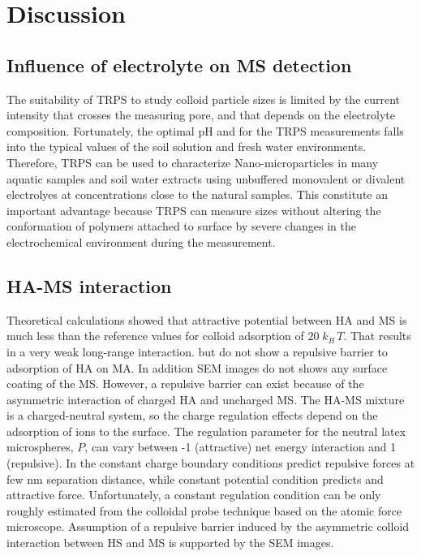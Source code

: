 \documentclass[journal=langd5,manuscript=article]{achemso}
\begin{document}
\section{Discussion}


\subsection{Influence of electrolyte on MS detection}
%
The suitability of TRPS to study colloid particle sizes is limited by the current intensity that crosses the measuring pore, and  that depends on the electrolyte composition. Fortunately, the optimal pH and \ce{[Ca^{2+}]} for the TRPS measurements falls into the typical values of the soil solution\cite{wolt1994soil} and  fresh water environments\cite{Stumm1993}. Therefore, TRPS can be used to characterize Nano-microparticles in many  aquatic samples and soil water extracts using unbuffered monovalent or divalent electrolyes at concentrations close to the natural samples. This constitute an important advantage because TRPS can measure sizes without altering the conformation of polymers attached to surface by severe changes in the electrochemical environment during the measurement.

\subsection{HA-MS interaction}
Theoretical calculations showed that attractive potential between HA and MS 
is much less than the reference values for colloid adsorption  of $20\;k_B\,T$\cite{Adamczyk1999}. That results in a very weak long-range interaction.
but do not show a repulsive barrier to adsorption of HA on MA. In addition 
 SEM images do not shows any surface coating of the MS. 
However, a repulsive barrier can exist because of the asymmetric interaction of charged HA and uncharged MS. 
The HA-MS mixture is a charged-neutral system, so the charge regulation effects depend on the adsorption of ions to the surface.
The regulation parameter for the neutral latex microspheres, $P$, can vary between -1 (attractive) net energy interaction and 1  (repulsive). In the constant charge boundary conditions predict  repulsive forces at few nm separation distance, while constant potential condition predicts and attractive force\cite{Trefalt2014}.
Unfortunately, a constant regulation condition can be only roughly estimated from the  colloidal probe technique based on the atomic force microscope\cite{Ruiz-Cabello2013}.
Assumption of a repulsive barrier induced by the asymmetric colloid interaction between HS and MS is supported by the SEM images.
\end{document}
